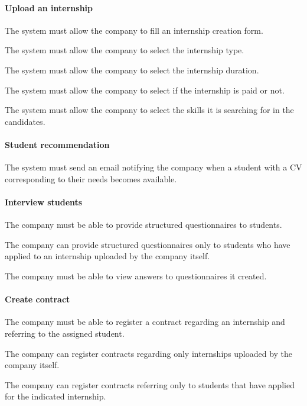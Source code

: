 \paragraph{Upload an internship}
\begin{requirements}[resume]
\item The system must allow the company to fill an internship creation form.
\item The system must allow the company to select the internship type.
\item The system must allow the company to select the internship duration.
\item The system must allow the company to select if the internship is paid or not.
\item The system must allow the company to select the skills it is searching for in the candidates.
\end{requirements}
\paragraph{Student recommendation}
\begin{requirements}[resume]
\item The system must send an email notifying the company when a student with a CV corresponding to their needs becomes available.
\end{requirements}
\paragraph{Interview students}
\begin{requirements}[resume]
\item The company must be able to provide structured questionnaires to students.
\item The company can provide structured questionnaires only to students who have applied to an internship uploaded by the company itself.
\item The company must be able to view answers to questionnaires it created.
\end{requirements}
\paragraph{Create contract}
\begin{requirements}[resume]
\item The company must be able to register a contract regarding an internship and referring to the assigned student.
\item The company can register contracts regarding only internships uploaded by the company itself.
\item The company can register contracts referring only to students that have applied for the indicated internship.
\end{requirements}
